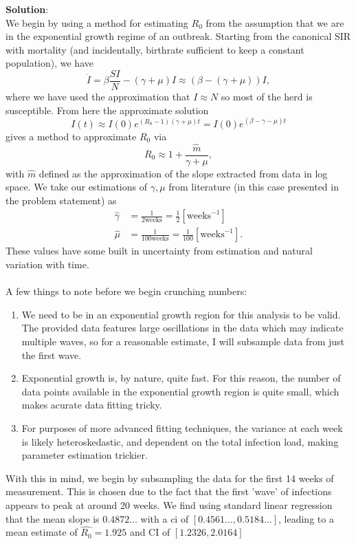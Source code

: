 \documentclass[11pt]{article}
\begin{document}
\begin{enumerate}
\begin{enumerate}[label=\alph*.]
	\begin{tcolorbox}[breakable]
	\textbf{Solution}:\\
	We begin by using a method for estimating $R_0$ from the assumption that we are in the exponential growth regime of an outbreak. Starting from the canonical SIR with mortality (and incidentally, birthrate sufficient to keep a constant population), we have
	\begin{equation*}
		\dot{I} = \beta \frac{SI}{N}-(\gamma+\mu)I \approx (\beta-(\gamma+\mu))I,
	\end{equation*}
	where we have used the approximation that $I\approx N$ so most of the herd is susceptible. From here the approximate solution
	\begin{equation*}
		I(t)\approx I(0)e^{(R_0-1)(\gamma+\mu)t}=I(0)e^{(\beta-\gamma-\mu)t}
	\end{equation*}
	gives a method to approximate $R_0$ via 
	\begin{equation*}
		R_0\approx1+\frac{\hat{m}}{\gamma+\mu},
	\end{equation*}
	with $\hat{m}$ defined as the approximation of the slope extracted from data in log space. We take our estimations of $\gamma, \mu$ from literature (in this case presented in the problem statement) as 
	\begin{align*}
		\hat{\gamma} &= \frac{1}{2 \text{weeks}} = \frac{1}{2}[\text{weeks}^{-1}]\\
		\hat{\mu} &= \frac{1}{100 \text{weeks}}=\frac{1}{100}[\text{weeks}^{-1}].
	\end{align*}
	These values have some built in uncertainty from estimation and natural variation with time.\\
	\\
	A few things to note before we begin crunching numbers:
	\begin{enumerate}
		\item We need to be in an exponential growth region for this analysis to be valid. The provided data features large oscillations in the data which may indicate multiple waves, so for a reasonable estimate, I will subsample data from just the first wave.
		\item Exponential growth is, by nature, quite fast. For this reason, the number of data points available in the exponential growth region is quite small, which makes acurate data fitting tricky.
		\item For purposes of more advanced fitting techniques, the variance at each week is likely heteroskedastic, and dependent on the total infection load, making parameter estimation trickier.
	\end{enumerate}
	With this in mind, we begin by subsampling the data for the first 14 weeks of measurement. This is chosen due to the fact that the first 'wave' of infections appears to peak at around 20 weeks. We find using standard linear regression that the mean slope is $0.4872\ldots$ with a ci of $ [0.4561\ldots, 0.5184\ldots]$, leading to a mean estimate of $\hat{R_0}=1.925$ and CI of $[1.2326,2.0164]$
	

\end{tcolorbox}
\end{enumerate}
\end{enumerate}
\end{document}
